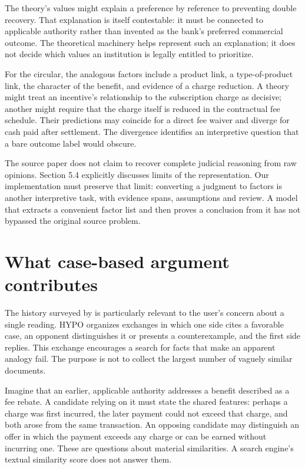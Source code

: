 \documentclass[12pt,a4paper,oneside,openany]{book}
\begin{document}
The theory's values might explain a preference by reference to preventing double
recovery. That explanation is itself contestable: it must be connected to
applicable authority rather than invented as the bank's preferred commercial
outcome. The theoretical machinery helps represent such an explanation; it does
not decide which values an institution is legally entitled to prioritize.

For the circular, the analogous factors include a product link, a type-of-product
link, the character of the benefit, and evidence of a charge reduction. A theory
might treat an incentive's relationship to the subscription charge as decisive;
another might require that the charge itself is reduced in the contractual fee
schedule. Their predictions may coincide for a direct fee waiver and diverge for
cash paid after settlement. The divergence identifies an interpretive question
that a bare outcome label would obscure.

The source paper does not claim to recover complete judicial reasoning from raw
opinions. Section 5.4 explicitly discusses limits of the representation. Our
implementation must preserve that limit: converting a judgment to factors is
another interpretive task, with evidence spans, assumptions and review. A model
that extracts a convenient factor list and then proves a conclusion from it has
not bypassed the original source problem.

\section{What case-based argument contributes}
\label{merge:M05:02}


The history surveyed by \citet[sections 2--3]{hypolegacy2017} is particularly
relevant to the user's concern about a single reading. HYPO organizes exchanges
in which one side cites a favorable case, an opponent distinguishes it or presents
a counterexample, and the first side replies. This exchange encourages a search
for facts that make an apparent analogy fail. The purpose is not to collect the
largest number of vaguely similar documents.

Imagine that an earlier, applicable authority addresses a benefit described as a
fee rebate. A candidate relying on it must state the shared features: perhaps a
charge was first incurred, the later payment could not exceed that charge, and
both arose from the same transaction. An opposing candidate may distinguish an
offer in which the payment exceeds any charge or can be earned without incurring
one. These are questions about material similarities. A search engine's textual
similarity score does not answer them.
\end{document}
